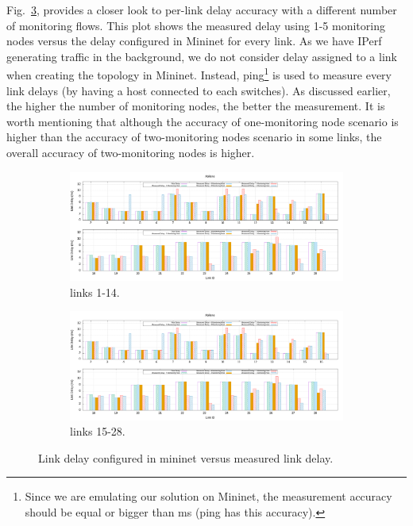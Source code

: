 \documentclass[10pt, journal, letterpaper]{IEEEtran}
\begin{document}
Fig.~\ref{fig:real_delay_abile}, provides a closer look to per-link delay accuracy with a different number of monitoring flows. This plot shows the measured delay using 1-5 monitoring nodes versus the delay configured in Mininet for every link. As we have IPerf generating traffic in the background, we do not consider delay assigned to a link when creating the topology in Mininet. Instead, ping\footnote{Since we are emulating our solution on Mininet, the measurement accuracy should be equal or bigger than ms (ping has this accuracy).} is used to measure every link delays (by having a host connected to each switches). As discussed earlier, the higher the number of monitoring nodes, the better the measurement. It is worth mentioning that although the accuracy of one-monitoring node scenario is higher than the accuracy of two-monitoring nodes scenario in some links, the overall accuracy of two-monitoring nodes is higher. 

\begin{figure}
    \begin{subfigure}{\columnwidth}
      \centering
      \includegraphics[width=\columnwidth]{img/eval_Abilene_link_delay_real_and_measured.png}
      \caption{links 1-14.}
      \label{fig:real_delay_abile_p1}
    \end{subfigure}
    \begin{subfigure}{\columnwidth}
      \centering
      \includegraphics[width=\columnwidth]{img/eval_Abilene_link_delay_real_and_measured.png}
     \caption{links 15-28.}
     \label{fig:real_delay_abile_p2}
    \end{subfigure}
    \caption{Link delay configured in mininet versus measured link delay.}
    \label{fig:real_delay_abile}
\end{figure}
\end{document}
